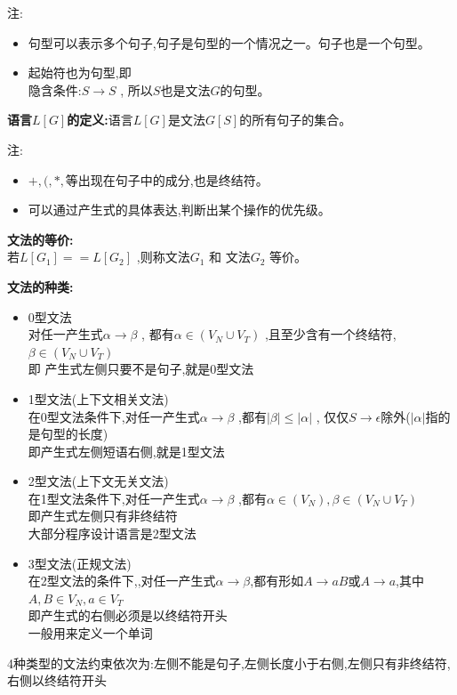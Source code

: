     注:
    \begin{itemize}
      \item 句型可以表示多个句子,句子是句型的一个情况之一。句子也是一个句型。
      \item 起始符也为句型,即\\
      隐含条件:$S\to S$ , 所以$S$也是文法$G$的句型。
    \end{itemize}

    \spaceline
    \textbf{语言$L[G]$的定义:}语言$L[G]$是文法$G[S]$的所有句子的集合。

    注:
    \begin{itemize}
      \item $+,(,*,$等出现在句子中的成分,也是终结符。
      \item 可以通过产生式的具体表达,判断出某个操作的优先级。
    \end{itemize}

    \spaceline
    \textbf{文法的等价:}\\
    若$L[G_1] == L[G_2]$ ,则称文法$G_1$ 和 文法$G_2$ 等价。

    \spaceline
    \textbf{文法的种类:}
    \begin{itemize}
      \item 0型文法\\
      对任一产生式$\alpha \to \beta$ , 都有$\alpha \in (V_N\cup V_T)$ ,且至少含有一个终结符,$\beta \in (V_N\cup V_T)$\\
      即 产生式左侧只要不是句子,就是0型文法
      \item 1型文法(上下文相关文法)\\
      在0型文法条件下,对任一产生式$\alpha \to \beta$ ,都有$|\beta| \leq |\alpha|$ , 仅仅$S \to \epsilon $除外($|\alpha|$指的是句型的长度)\\
      即产生式左侧短语右侧,就是1型文法
      \item 2型文法(上下文无关文法)\\
      在1型文法条件下,对任一产生式$\alpha \to \beta$ ,都有$\alpha \in (V_N) , \beta \in (V_N\cup V_T)$\\
      即产生式左侧只有非终结符\\
      大部分程序设计语言是2型文法
      \item 3型文法(正规文法)\\
      在2型文法的条件下,,对任一产生式$\alpha \to \beta$,都有形如$A\to aB$或$A \to a$,其中$A,B\in V_N , a \in V_T$\\
      即产生式的右侧必须是以终结符开头\\
      一般用来定义一个单词
    \end{itemize}
    4种类型的文法约束依次为:左侧不能是句子,左侧长度小于右侧,左侧只有非终结符,右侧以终结符开头

